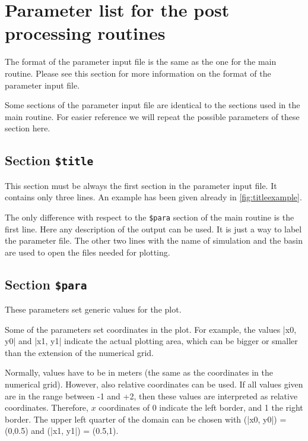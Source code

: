 \section{Parameter list for the post processing routines}

The format of the parameter input file is the same as the one for
the main routine. Please see this section for more information
on the format of the parameter input file.

Some sections of the parameter input file are identical to the
sections used in the main routine. For easier reference we will
repeat the possible parameters of these section here.


\subsection{Section {\tt \$title}}

This section must be always the first section in the parameter input file.
It contains only three lines. An example has been given already in
\Fig\ref{fig:titleexample}.

The only difference with respect to the {\tt \$para} section of the main
routine is the first line. Here any description of the output can be used.
It is just a way to label the parameter file.  The other two lines with
the name of simulation and the basin are used to open the files needed
for plotting.


\subsection{Section {\tt \$para}}


These parameters set generic values for the plot.

Some of the parameters set coordinates in the plot. For example, the
values |x0, y0| and |x1, y1| indicate the actual plotting area, which can
be bigger or smaller than the extension of the numerical grid.

Normally, values have to be in meters (the same as the coordinates in the
numerical grid). However, also relative coordinates can be used. If all
values given are in the range between -1 and +2, then these values
are interpreted as relative coordinates. Therefore, $x$ coordinates of
0 indicate the left border, and 1 the right border. The upper left quarter
of the domain can be chosen with (|x0, y0|) = (0,0.5) and
(|x1, y1|) = (0.5,1).

\par
{}
\par

